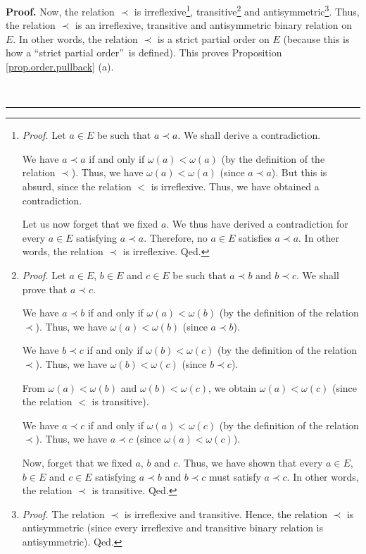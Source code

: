 \documentclass[numbers=enddot,12pt,final,onecolumn,notitlepage,abstracton]{scrartcl}
\theoremstyle{definition}
\newenvironment{proof}[1][Proof]{\noindent\textbf{#1.} }{\ \rule{0.5em}{0.5em}}
\newenvironment{verlong}{}{}
\newenvironment{noncompile}{}{}
\begin{document}
\begin{verlong}
\begin{footnotesize}
\begin{noncompile}
\begin{proof}
Now, the relation $\prec$ is irreflexive\footnote{\textit{Proof.} Let $a\in E$
be such that $a\prec a$. We shall derive a contradiction.
\par
We have $a\prec a$ if and only if $\omega\left(  a\right)  <\omega\left(
a\right)  $ (by the definition of the relation $\prec$). Thus, we have
$\omega\left(  a\right)  <\omega\left(  a\right)  $ (since $a\prec a$). But
this is absurd, since the relation $<$ is irreflexive. Thus, we have obtained
a contradiction.
\par
Let us now forget that we fixed $a$. We thus have derived a contradiction for
every $a\in E$ satisfying $a\prec a$. Therefore, no $a\in E$ satisfies $a\prec
a$. In other words, the relation $\prec$ is irreflexive. Qed.},
transitive\footnote{\textit{Proof.} Let $a\in E$, $b\in E$ and $c\in E$ be
such that $a\prec b$ and $b\prec c$. We shall prove that $a\prec c$.
\par
We have $a\prec b$ if and only if $\omega\left(  a\right)  <\omega\left(
b\right)  $ (by the definition of the relation $\prec$). Thus, we have
$\omega\left(  a\right)  <\omega\left(  b\right)  $ (since $a\prec b$).
\par
We have $b\prec c$ if and only if $\omega\left(  b\right)  <\omega\left(
c\right)  $ (by the definition of the relation $\prec$). Thus, we have
$\omega\left(  b\right)  <\omega\left(  c\right)  $ (since $b\prec c$).
\par
From $\omega\left(  a\right)  <\omega\left(  b\right)  $ and $\omega\left(
b\right)  <\omega\left(  c\right)  $, we obtain $\omega\left(  a\right)
<\omega\left(  c\right)  $ (since the relation $<$ is transitive).
\par
We have $a\prec c$ if and only if $\omega\left(  a\right)  <\omega\left(
c\right)  $ (by the definition of the relation $\prec$). Thus, we have $a\prec
c$ (since $\omega\left(  a\right)  <\omega\left(  c\right)  $).
\par
Now, forget that we fixed $a$, $b$ and $c$. Thus, we have shown that every
$a\in E$, $b\in E$ and $c\in E$ satisfying $a\prec b$ and $b\prec c$ must
satisfy $a\prec c$. In other words, the relation $\prec$ is transitive. Qed.}
and antisymmetric\footnote{\textit{Proof.} The relation $\prec$ is irreflexive
and transitive. Hence, the relation $\prec$ is antisymmetric (since every
irreflexive and transitive binary relation is antisymmetric). Qed.}. Thus, the
relation $\prec$ is an irreflexive, transitive and antisymmetric binary
relation on $E$. In other words, the relation $\prec$ is a strict partial
order on $E$ (because this is how a \textquotedblleft strict partial
order\textquotedblright\ is defined). This proves Proposition
\ref{prop.order.pullback} (a).


\end{proof}
\end{noncompile}
\end{footnotesize}
\end{verlong}
\end{document}
